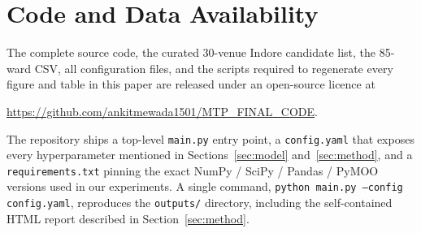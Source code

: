 \documentclass[conference]{IEEEtran}
\begin{document}
\section*{Code and Data Availability}
\label{sec:repro}
The complete source code, the curated 30-venue Indore candidate
list, the 85-ward CSV, all configuration files, and the scripts
required to regenerate every figure and table in this paper are
released under an open-source licence at
\begin{center}
\url{https://github.com/ankitmewada1501/MTP_FINAL_CODE}.
\end{center}
The repository ships a top-level \texttt{main.py} entry point, a
\texttt{config.yaml} that exposes every hyperparameter mentioned in
Sections~\ref{sec:model} and~\ref{sec:method}, and a
\texttt{requirements.txt} pinning the exact NumPy / SciPy / Pandas /
PyMOO versions used in our experiments. A single command,
\texttt{python main.py --config config.yaml}, reproduces the
\texttt{outputs/} directory, including the self-contained HTML
report described in Section~\ref{sec:method}.
\end{document}
